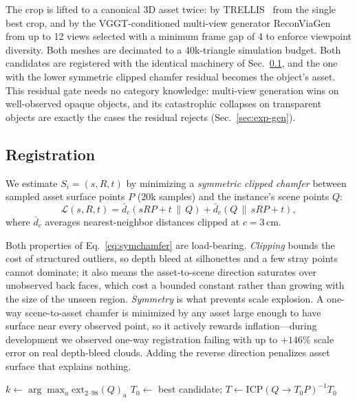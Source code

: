 The crop is lifted to a canonical 3D asset twice: by TRELLIS~\cite{trellis}
from the single best crop, and by the VGGT-conditioned multi-view
generator ReconViaGen~\cite{reconviagen} from up to 12 views selected with
a minimum frame gap of 4 to enforce viewpoint diversity. Both meshes are
decimated to a 40k-triangle simulation budget. Both candidates are
registered with the identical machinery of
Sec.~\ref{sec:registration}, and the one with the lower symmetric
clipped chamfer residual becomes the object's asset. This residual
gate needs no category knowledge: multi-view generation wins on
well-observed opaque objects, and its catastrophic collapses on
transparent objects are exactly the cases the residual rejects
(Sec.~\ref{sec:exp-gen}).

\subsection{Registration}
\label{sec:registration}
We estimate $S_i=(s,R,t)$ by minimizing a \emph{symmetric clipped
chamfer} between sampled asset surface points $P$ (20k samples) and the
instance's scene points $Q$:
\begin{equation}
\mathcal{L}(s,R,t) = \bar{d}_c\!\left(sRP{+}t \,\|\, Q\right)
                   + \bar{d}_c\!\left(Q \,\|\, sRP{+}t\right),
\label{eq:symchamfer}
\end{equation}
where $\bar{d}_c$ averages nearest-neighbor distances clipped at
$c{=}3$\,cm.

Both properties of Eq.~\ref{eq:symchamfer} are load-bearing.
\emph{Clipping} bounds the cost of structured outliers, so depth bleed at
silhouettes and a few stray points cannot dominate; it also means the
asset-to-scene direction saturates over unobserved back faces, which cost
a bounded constant rather than growing with the size of the unseen region.
\emph{Symmetry} is what prevents scale explosion. A one-way scene-to-asset
chamfer is minimized by any asset large enough to have surface near every
observed point, so it actively rewards inflation---during development we
observed one-way registration failing with up to $+146\%$ scale error on
real depth-bleed clouds. Adding the reverse direction penalizes asset
surface that explains nothing.

\ifextended
\begin{algorithm}[t]
\footnotesize
\SetAlgoLined
\DontPrintSemicolon
{}
$k \leftarrow \arg\max_a \mathrm{ext}_{2\text{--}98}(Q)_a$ 
$T_0 \leftarrow$ best candidate;\quad
$T \leftarrow \mathrm{ICP}(Q \to T_0 P)^{-1} T_0$ 
\caption{Sim(3) registration}
\label{alg:align}
\end{algorithm}
\fi


